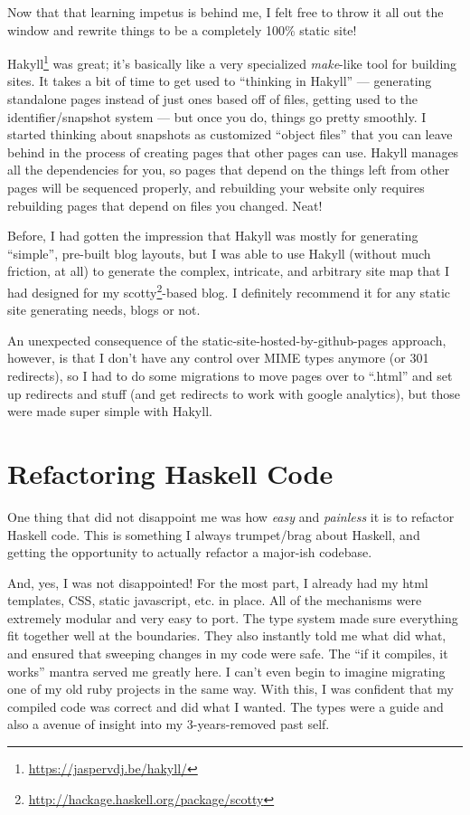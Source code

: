 \documentclass[]{article}
\renewcommand{\href}[2]{#2\footnote{\url{#1}}}
\begin{document}
Now that that learning impetus is behind me, I felt free to throw it all out the
window and rewrite things to be a completely 100\% static site!

\href{https://jaspervdj.be/hakyll/}{Hakyll} was great; it's basically like a
very specialized \emph{make}-like tool for building sites. It takes a bit of
time to get used to ``thinking in Hakyll'' --- generating standalone pages
instead of just ones based off of files, getting used to the identifier/snapshot
system --- but once you do, things go pretty smoothly. I started thinking about
snapshots as customized ``object files'' that you can leave behind in the
process of creating pages that other pages can use. Hakyll manages all the
dependencies for you, so pages that depend on the things left from other pages
will be sequenced properly, and rebuilding your website only requires rebuilding
pages that depend on files you changed. Neat!

Before, I had gotten the impression that Hakyll was mostly for generating
``simple'', pre-built blog layouts, but I was able to use Hakyll (without much
friction, at all) to generate the complex, intricate, and arbitrary site map
that I had designed for my
\href{http://hackage.haskell.org/package/scotty}{scotty}-based blog. I
definitely recommend it for any static site generating needs, blogs or not.

An unexpected consequence of the static-site-hosted-by-github-pages approach,
however, is that I don't have any control over MIME types anymore (or 301
redirects), so I had to do some migrations to move pages over to ``.html'' and
set up redirects and stuff (and get redirects to work with google analytics),
but those were made super simple with Hakyll.

\section{Refactoring Haskell Code}\label{refactoring-haskell-code}

One thing that did not disappoint me was how \emph{easy} and \emph{painless} it
is to refactor Haskell code. This is something I always trumpet/brag about
Haskell, and getting the opportunity to actually refactor a major-ish codebase.

And, yes, I was not disappointed! For the most part, I already had my html
templates, CSS, static javascript, etc. in place. All of the mechanisms were
extremely modular and very easy to port. The type system made sure everything
fit together well at the boundaries. They also instantly told me what did what,
and ensured that sweeping changes in my code were safe. The ``if it compiles, it
works'' mantra served me greatly here. I can't even begin to imagine migrating
one of my old ruby projects in the same way. With this, I was confident that my
compiled code was correct and did what I wanted. The types were a guide and also
a avenue of insight into my 3-years-removed past self.
\end{document}
